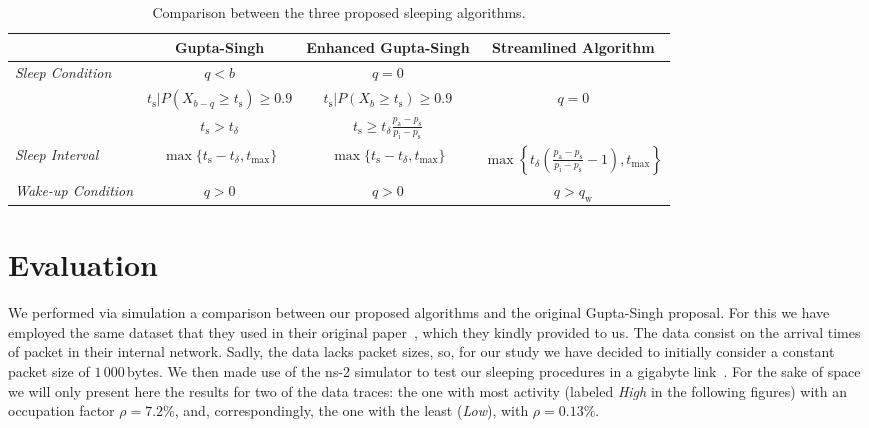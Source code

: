 \documentclass[conference,english]{IEEEtran}
\begin{document}
\begin{table*}
  \centering
  \begin{tabular}{l|c|c|c|}
    & \textbf{Gupta-Singh} & \textbf{Enhanced Gupta-Singh} &
    \textbf{Streamlined Algorithm}\\\hline

    \multirow{3}{*}{\emph{Sleep Condition}} &
    $q < b$ & $q = 0$ & \\
    &
    $t_{\mathrm{s}} | P\left(X_{b-q} \ge t_{\mathrm{s}}\right) \ge
    0.9$ &
    $t_{\mathrm{s}} | P\left(X_b \ge t_{\mathrm{s}}\right) \ge
    0.9$ & $q = 0$  \\ &
      $t_{\mathrm{s}} > t_{\delta}$ &
      $t_{\mathrm{s}} \ge
      t_{\delta}\frac{p_{\mathrm{a}}-p_{\mathrm{s}}}{p_{\mathrm{i}} -
        p_{\mathrm{s}}}$ & \\ \hline
      
      \emph{Sleep Interval} & $\max\{t_{\mathrm{s}} - t_{\delta},
      t_{\max}\}$ & $\max\{t_{\mathrm{s}} - t_{\delta},
      t_{\max}\}$ & $\max \left\{t_{\delta}\left(\frac{p_{\mathrm{a}}-p_{\mathrm{s}}}{p_{\mathrm{i}} -
          p_{\mathrm{s}}} - 1 \right), t_{\max} \right\}$ \\\hline
      
    \emph{Wake-up Condition} & $q > 0$ & $q > 0$
    & $q > q_{\mathrm{w}}$ \\\hline
  \end{tabular}
  \caption{Comparison between the three proposed sleeping algorithms.}
  \label{tab:comparison}
\end{table*}

\section{Evaluation}
\label{sec:evaluation}

We performed via simulation a comparison between our proposed algorithms and
the original Gupta-Singh proposal. For this we have employed the same dataset
that they used in their original
paper~\cite{gupta07:_using_low_power_modes_for}, which they kindly provided to
us. The data consist on the arrival times of packet in their internal network.
Sadly, the data lacks packet sizes, so, for our study we have decided to
initially consider a constant packet size of $1\,000\,$bytes. We then made use
of the ns-2 simulator to test our sleeping procedures in a gigabyte
link~\cite{ns-2}. For the sake of space we will only present here the results
for two of the data traces: the one with most activity (labeled \emph{High} in
the following figures) with an occupation factor $\rho=7.2\%$, and,
correspondingly, the one with the least (\emph{Low}), with $\rho=0.13\%$.
\end{document}
